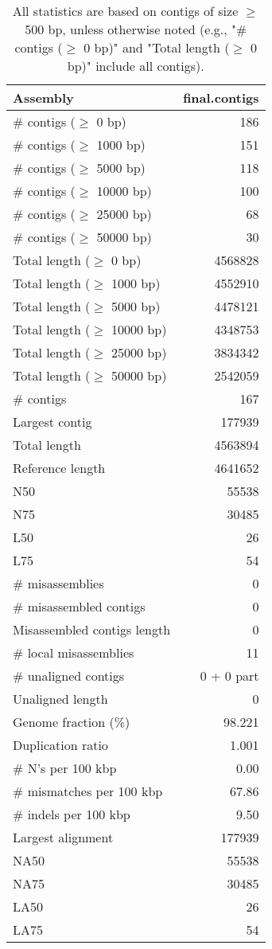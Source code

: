 \documentclass[12pt,a4paper]{article}
\begin{document}
\begin{table}[ht]
\begin{center}
\caption{All statistics are based on contigs of size $\geq$ 500 bp, unless otherwise noted (e.g., "\# contigs ($\geq$ 0 bp)" and "Total length ($\geq$ 0 bp)" include all contigs).}
\begin{tabular}{|l*{1}{|r}|}
\hline
Assembly & final.contigs \\ \hline
\# contigs ($\geq$ 0 bp) & 186 \\ \hline
\# contigs ($\geq$ 1000 bp) & 151 \\ \hline
\# contigs ($\geq$ 5000 bp) & 118 \\ \hline
\# contigs ($\geq$ 10000 bp) & 100 \\ \hline
\# contigs ($\geq$ 25000 bp) & 68 \\ \hline
\# contigs ($\geq$ 50000 bp) & 30 \\ \hline
Total length ($\geq$ 0 bp) & 4568828 \\ \hline
Total length ($\geq$ 1000 bp) & 4552910 \\ \hline
Total length ($\geq$ 5000 bp) & 4478121 \\ \hline
Total length ($\geq$ 10000 bp) & 4348753 \\ \hline
Total length ($\geq$ 25000 bp) & 3834342 \\ \hline
Total length ($\geq$ 50000 bp) & 2542059 \\ \hline
\# contigs & 167 \\ \hline
Largest contig & 177939 \\ \hline
Total length & 4563894 \\ \hline
Reference length & 4641652 \\ \hline
N50 & 55538 \\ \hline
N75 & 30485 \\ \hline
L50 & 26 \\ \hline
L75 & 54 \\ \hline
\# misassemblies & 0 \\ \hline
\# misassembled contigs & 0 \\ \hline
Misassembled contigs length & 0 \\ \hline
\# local misassemblies & 11 \\ \hline
\# unaligned contigs & 0 + 0 part \\ \hline
Unaligned length & 0 \\ \hline
Genome fraction (\%) & 98.221 \\ \hline
Duplication ratio & 1.001 \\ \hline
\# N's per 100 kbp & 0.00 \\ \hline
\# mismatches per 100 kbp & 67.86 \\ \hline
\# indels per 100 kbp & 9.50 \\ \hline
Largest alignment & 177939 \\ \hline
NA50 & 55538 \\ \hline
NA75 & 30485 \\ \hline
LA50 & 26 \\ \hline
LA75 & 54 \\ \hline
\end{tabular}
\end{center}
\end{table}
\end{document}
